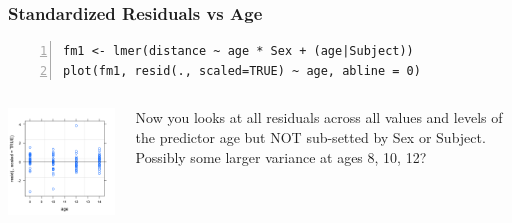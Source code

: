\documentclass{beamer}
\begin{document}
\begin{frame}[fragile]
    \frametitle{Standardized Residuals vs Age}
    \scriptsize\begin{Verbatim}[numbers=left,numbersep=6pt,frame=single]
fm1 <- lmer(distance ~ age * Sex + (age|Subject))
plot(fm1, resid(., scaled=TRUE) ~ age, abline = 0)
    \end{Verbatim}
    \begin{columns}
        \begin{column}{0.5\textwidth}
            \includegraphics[width=\textwidth]{lectures/day_7_diagnostics_of_mems/figures/unnamed-chunk-27-1.png}
        \end{column}
        \begin{column}{0.5\textwidth}
        \normalsize
            Now you looks at all residuals across all values and levels of the predictor age but NOT sub-setted by Sex or Subject. Possibly some larger variance at ages 8, 10, 12?
        \end{column}
    \end{columns}
\end{frame}
\end{document}
